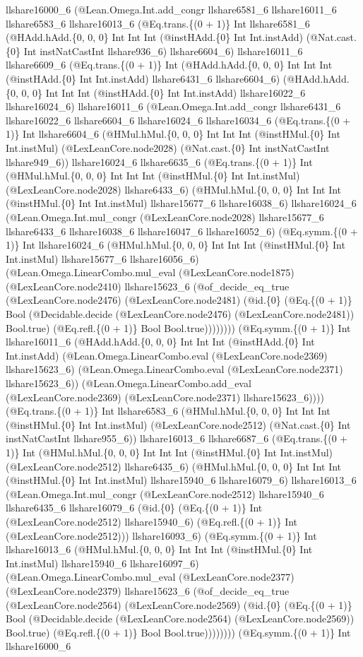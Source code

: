 \documentclass[11pt]{article}
\begin{document}
llshare16000\_6 (@Lean.Omega.Int.add\_congr llshare6581\_6 llshare16011\_6 llshare6583\_6 llshare16013\_6 (@Eq.trans.\{(0 + 1)\} Int llshare6581\_6 (@HAdd.hAdd.\{0, 0, 0\} Int Int Int (@instHAdd.\{0\} Int Int.instAdd) (@Nat.cast.\{0\} Int instNatCastInt llshare936\_6) llshare6604\_6) llshare16011\_6 llshare6609\_6 (@Eq.trans.\{(0 + 1)\} Int (@HAdd.hAdd.\{0, 0, 0\} Int Int Int (@instHAdd.\{0\} Int Int.instAdd) llshare6431\_6 llshare6604\_6) (@HAdd.hAdd.\{0, 0, 0\} Int Int Int (@instHAdd.\{0\} Int Int.instAdd) llshare16022\_6 llshare16024\_6) llshare16011\_6 (@Lean.Omega.Int.add\_congr llshare6431\_6 llshare16022\_6 llshare6604\_6 llshare16024\_6 llshare16034\_6 (@Eq.trans.\{(0 + 1)\} Int llshare6604\_6 (@HMul.hMul.\{0, 0, 0\} Int Int Int (@instHMul.\{0\} Int Int.instMul) (@LexLeanCore.node2028) (@Nat.cast.\{0\} Int instNatCastInt llshare949\_6)) llshare16024\_6 llshare6635\_6 (@Eq.trans.\{(0 + 1)\} Int (@HMul.hMul.\{0, 0, 0\} Int Int Int (@instHMul.\{0\} Int Int.instMul) (@LexLeanCore.node2028) llshare6433\_6) (@HMul.hMul.\{0, 0, 0\} Int Int Int (@instHMul.\{0\} Int Int.instMul) llshare15677\_6 llshare16038\_6) llshare16024\_6 (@Lean.Omega.Int.mul\_congr (@LexLeanCore.node2028) llshare15677\_6 llshare6433\_6 llshare16038\_6 llshare16047\_6 llshare16052\_6) (@Eq.symm.\{(0 + 1)\} Int llshare16024\_6 (@HMul.hMul.\{0, 0, 0\} Int Int Int (@instHMul.\{0\} Int Int.instMul) llshare15677\_6 llshare16056\_6) (@Lean.Omega.LinearCombo.mul\_eval (@LexLeanCore.node1875) (@LexLeanCore.node2410) llshare15623\_6 (@of\_decide\_eq\_true (@LexLeanCore.node2476) (@LexLeanCore.node2481) (@id.\{0\} (@Eq.\{(0 + 1)\} Bool (@Decidable.decide (@LexLeanCore.node2476) (@LexLeanCore.node2481)) Bool.true) (@Eq.refl.\{(0 + 1)\} Bool Bool.true)))))))) (@Eq.symm.\{(0 + 1)\} Int llshare16011\_6 (@HAdd.hAdd.\{0, 0, 0\} Int Int Int (@instHAdd.\{0\} Int Int.instAdd) (@Lean.Omega.LinearCombo.eval (@LexLeanCore.node2369) llshare15623\_6) (@Lean.Omega.LinearCombo.eval (@LexLeanCore.node2371) llshare15623\_6)) (@Lean.Omega.LinearCombo.add\_eval (@LexLeanCore.node2369) (@LexLeanCore.node2371) llshare15623\_6)))) (@Eq.trans.\{(0 + 1)\} Int llshare6583\_6 (@HMul.hMul.\{0, 0, 0\} Int Int Int (@instHMul.\{0\} Int Int.instMul) (@LexLeanCore.node2512) (@Nat.cast.\{0\} Int instNatCastInt llshare955\_6)) llshare16013\_6 llshare6687\_6 (@Eq.trans.\{(0 + 1)\} Int (@HMul.hMul.\{0, 0, 0\} Int Int Int (@instHMul.\{0\} Int Int.instMul) (@LexLeanCore.node2512) llshare6435\_6) (@HMul.hMul.\{0, 0, 0\} Int Int Int (@instHMul.\{0\} Int Int.instMul) llshare15940\_6 llshare16079\_6) llshare16013\_6 (@Lean.Omega.Int.mul\_congr (@LexLeanCore.node2512) llshare15940\_6 llshare6435\_6 llshare16079\_6 (@id.\{0\} (@Eq.\{(0 + 1)\} Int (@LexLeanCore.node2512) llshare15940\_6) (@Eq.refl.\{(0 + 1)\} Int (@LexLeanCore.node2512))) llshare16093\_6) (@Eq.symm.\{(0 + 1)\} Int llshare16013\_6 (@HMul.hMul.\{0, 0, 0\} Int Int Int (@instHMul.\{0\} Int Int.instMul) llshare15940\_6 llshare16097\_6) (@Lean.Omega.LinearCombo.mul\_eval (@LexLeanCore.node2377) (@LexLeanCore.node2379) llshare15623\_6 (@of\_decide\_eq\_true (@LexLeanCore.node2564) (@LexLeanCore.node2569) (@id.\{0\} (@Eq.\{(0 + 1)\} Bool (@Decidable.decide (@LexLeanCore.node2564) (@LexLeanCore.node2569)) Bool.true) (@Eq.refl.\{(0 + 1)\} Bool Bool.true)))))))) (@Eq.symm.\{(0 + 1)\} Int llshare16000\_6 
\end{document}
